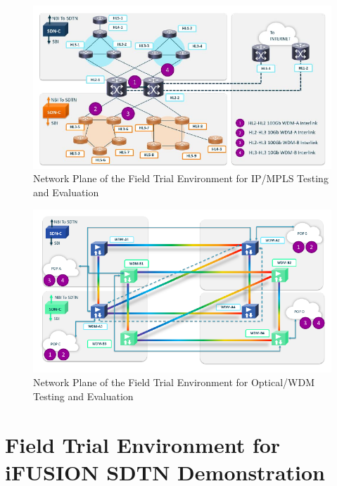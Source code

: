 \documentclass[a4paper,fleqn]{cas-dc}
\begin{document}

\begin{figure}
	\centering
		\includegraphics[scale=1]{figs/field_trial_environment_ip.pdf}
	\caption{Network Plane of the Field Trial Environment for IP/MPLS Testing and Evaluation}
	\label{FIG:field_trial_ip}
\end{figure}

\begin{figure}
	\centering
		\includegraphics[scale=1]{figs/field_trial_environment_optical.pdf}
	\caption{Network Plane of the Field Trial Environment for Optical/WDM Testing and Evaluation}
	\label{FIG:field_trial_optical}
\end{figure}

\section{Field Trial Environment for i\uppercase{FUSION} SDTN Demonstration}
\label{section:trial}
\end{document}
